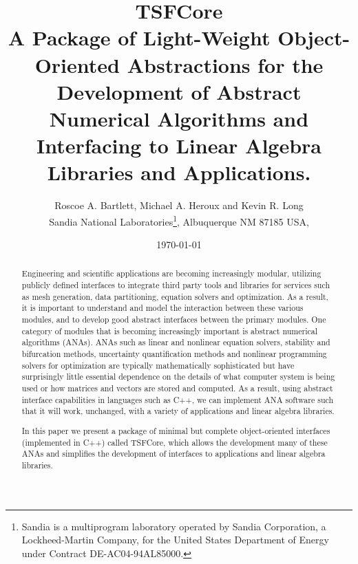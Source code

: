 \documentclass[10pt,fleqn]{article}
\begin{document}
%
%
\title{
{\Huge\bf TSFCore}\\[1.5ex]
A Package of Light-Weight Object-Oriented Abstractions for the
Development of Abstract Numerical Algorithms and Interfacing
to Linear Algebra Libraries and Applications.
}
\author{Roscoe A. Bartlett, Michael A. Heroux and Kevin R. Long \\
Sandia National Laboratories\footnote{
Sandia is a multiprogram laboratory operated by Sandia Corporation, a
Lockheed-Martin Company, for the United States Department of Energy
under Contract DE-AC04-94AL85000.}, Albuquerque NM 87185 USA, \\
}
\date{\today}

\maketitle

%
\begin{abstract}
%
Engineering and scientific applications are becoming increasingly
modular, utilizing publicly defined interfaces to integrate
third party tools and libraries for services such as
mesh generation, data partitioning, equation solvers and optimization.
As a result, it is important to understand and model the interaction between 
these various modules, and to develop good abstract interfaces between
the primary modules.  One category of modules that is becoming
increasingly important is abstract numerical algorithms (ANAs).  ANAs
such as linear and nonlinear equation solvers,
stability and bifurcation methods,
uncertainty quantification methods and nonlinear programming solvers
for optimization are typically mathematically 
sophisticated but have surprisingly little essential dependence on the
details of what computer system is being used or how matrices and
vectors are stored and computed.  As a result, using abstract
interface capabilities in languages such as C++, we can implement ANA
software such that it will work, unchanged, with a variety of
applications and linear algebra libraries.

In this paper we present a package of minimal but complete
object-oriented interfaces (implemented in C++) called TSFCore,
which allows the development many of these ANAs and
simplifies the development of interfaces to applications and linear
algebra libraries.
%
\end{abstract}
%

\tableofcontents

\listoffigures
\end{document}
